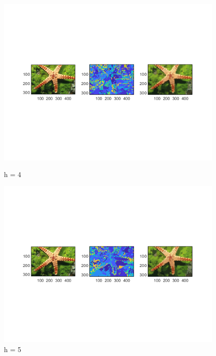 \documentclass[12pt]{article}
\begin{document}
\begin{figure}[H]
	\begin{minipage}{.5\textwidth}
	 \includegraphics[width=\textwidth,height=\textheight,keepaspectratio]{figs/2-a-ms-1-h4}
	 \caption{\small h = 4}
	\end{minipage}
	\begin{minipage}{.5\textwidth}
	 \includegraphics[width=\textwidth,height=\textheight,keepaspectratio]{figs/2-a-ms-1-h5}
	 \caption{\small h = 5}
	\end{minipage}
	\begin{minipage}{.5\textwidth}

\end{minipage}
\end{figure}
\end{document}

